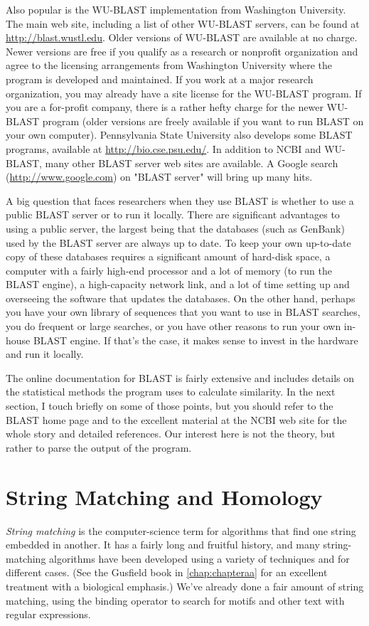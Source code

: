 Also popular is the WU-BLAST implementation from Washington University. The main web site, including a list of other WU-BLAST servers, can be found at \href{http://blast.wustl.edu}{http://blast.wustl.edu}. Older versions of WU-BLAST are available at no charge. Newer versions are free if you qualify as a research or nonprofit organization and agree to the licensing arrangements from Washington University where the program is developed and maintained. If you work at a major research organization, you may already have a site license for the WU-BLAST program. If you are a for-profit company, there is a rather hefty charge for the newer WU-BLAST program (older versions are freely available if you want to run BLAST on your own computer). Pennsylvania State University also develops some BLAST programs, available at \href{http://bio.cse.psu.edu/}{http://bio.cse.psu.edu/}. In addition to NCBI and WU-BLAST, many other BLAST server web sites are available. A Google search (\href{http://www.google.com}{http://www.google.com}) on "BLAST server" will bring up many hits.

A big question that faces researchers when they use BLAST is whether to use a public BLAST server or to run it locally. There are significant advantages to using a public server, the largest being that the databases (such as GenBank) used by the BLAST server are always up to date. To keep your own up-to-date copy of these databases requires a significant amount of hard-disk space, a computer with a fairly high-end processor and a lot of memory (to run the BLAST engine), a high-capacity network link, and a lot of time setting up and overseeing the software that updates the databases. On the other hand, perhaps you have your own library of sequences that you want to use in BLAST searches, you do frequent or large searches, or you have other reasons to run your own in-house BLAST engine. If that's the case, it makes sense to invest in the hardware and run it locally.

The online documentation for BLAST is fairly extensive and includes details on the statistical methods the program uses to calculate similarity. In the next section, I touch briefly on some of those points, but you should refer to the BLAST home page and to the excellent material at the NCBI web site for the whole story and detailed references. Our interest here is not the theory, but rather to parse the output of the program. 

\section{String Matching and Homology}
\textit{String matching} is the computer-science term for algorithms that find one string embedded in another. It has a fairly long and fruitful history, and many string-matching algorithms have been developed using a variety of techniques and for different cases. (See the Gusfield book in \autoref{chap:chapteraa} for an excellent treatment with a biological emphasis.) We've already done a fair amount of string matching, using the binding operator to search for motifs and other text with regular expressions.

